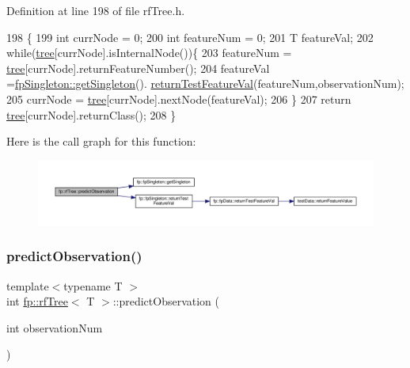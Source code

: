 Definition at line 198 of file rf\+Tree.\+h.


\begin{DoxyCode}
198                                                           \{
199                     \textcolor{keywordtype}{int} currNode = 0;
200                     \textcolor{keywordtype}{int} featureNum = 0;
201                     T featureVal;
202                     \textcolor{keywordflow}{while}(\hyperlink{classtree}{tree}[currNode].isInternalNode())\{
203                         featureNum = \hyperlink{classtree}{tree}[currNode].returnFeatureNumber();
204                         featureVal =\hyperlink{classfp_1_1fpSingleton_a8bdae77b68521003e3fc630edec2e240}{fpSingleton::getSingleton}().
      \hyperlink{classfp_1_1fpSingleton_ad74b421d65b17ba924244bff31fc9db6}{returnTestFeatureVal}(featureNum,observationNum);
205                         currNode = \hyperlink{classtree}{tree}[currNode].nextNode(featureVal);
206                     \}
207                     \textcolor{keywordflow}{return} \hyperlink{classtree}{tree}[currNode].returnClass();
208                 \}
\end{DoxyCode}
Here is the call graph for this function\+:
\nopagebreak
\begin{figure}[H]
\begin{center}
\leavevmode
\includegraphics[width=350pt]{classfp_1_1rfTree_aad66c44e2062c163b1560f9bf1bd759f_cgraph}
\end{center}
\end{figure}
\mbox{\label{classfp_1_1rfTree_aad66c44e2062c163b1560f9bf1bd759f}} 
\subsubsection{\texorpdfstring{predict\+Observation()}{predictObservation()}\hspace{0.1cm}{\footnotesize\ttfamily [2/2]}}
{\footnotesize\ttfamily template$<$typename T $>$ \\
int \hyperlink{classfp_1_1rfTree}{fp\+::rf\+Tree}$<$ T $>$\+::predict\+Observation (\begin{DoxyParamCaption}\item[{int}]{observation\+Num }\end{DoxyParamCaption})\hspace{0.3cm}{\ttfamily [inline]}}



